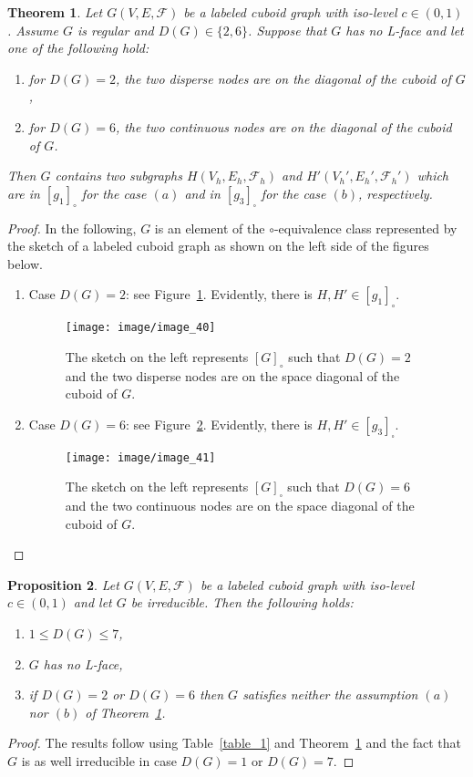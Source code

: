 \documentclass[a4paper,11pt]{article}
\newtheorem{theorem}{Theorem}[section]
\newtheorem{proposition}[theorem]{Proposition}
\begin{document}
\begin{theorem}\label{thm:class-2}
Let $G(V,E,\mathcal{F})$ be a labeled cuboid graph with iso-level $c\in (0,1)$. Assume $G$ is regular
and $D(G)\in \{2,6\}$. Suppose that $G$ has no L-face and let one of the following hold:
\begin{enumerate}
\item[$(a)$] for $D(G)=2$, the two disperse nodes are on the diagonal of the cuboid of $G$,
\item[$(b)$] for $D(G)=6$, the two continuous nodes are on the diagonal of the cuboid of $G$.
\end{enumerate}
Then $G$ contains two subgraphs $H(V_h,E_h,\mathcal{F}_h)$ and $H'(V_h',E_h',\mathcal{F}_h')$
which are in $[g_1]_{\circ}$ for the case $(a)$ and in $[g_3]_{\square}$ for the case $(b)$, respectively.
\end{theorem}
\begin{proof}In the following, $G$ is an element of the $\circ$-equivalence class represented by the
sketch of a labeled cuboid graph as shown on the left side of the figures below.
\begin{enumerate}
\item Case $D(G)=2$: see Figure~\ref{image_40}. Evidently, there is $H,H'\in [g_1]_{\circ}$.
\FloatBarrier
\begin{figure}[!ht]
\texttt{[image: image/image\_40]}
\caption{The sketch on the left represents $[G]_{\circ}$ such that $D(G)=2$ and the two disperse nodes
are on the space diagonal of the cuboid of $G$.}
\label{image_40}
\end{figure}
\FloatBarrier
\item Case $D(G)=6$: see Figure~\ref{image_41}. Evidently, there is $H,H'\in [g_3]_{\square}$.
\begin{figure}[!ht]
\texttt{[image: image/image\_41]}
\caption{The sketch on the left represents $[G]_{\square}$ such that $D(G)=6$ and the two
continuous nodes are on the space diagonal of the cuboid of $G$.}
\label{image_41}
\end{figure}
\FloatBarrier
\end{enumerate}
\vspace{-0.9cm}
\end{proof}
\FloatBarrier

\begin{proposition}
Let $G(V,E,\mathcal{F})$ be a labeled cuboid graph with iso-level $c\in (0,1)$ and let $G$ be irreducible.
Then the following holds:
\begin{enumerate}
\item $1\leq D(G)\leq 7$,
\item $G$ has no L-face,
\item if $D(G)=2$ or $D(G)=6$ then $G$ satisfies neither the assumption $(a)$ nor $(b)$ of Theorem~\ref{thm:class-2}.
\end{enumerate}
\label{prop:class-4}
\end{proposition}
\begin{proof}
The results follow using Table~\ref{table_1} and Theorem~\ref{thm:class-2} and the fact that $G$ is as well
irreducible in case $D(G)=1$ or $D(G)=7$.
\end{proof}
\end{document}
